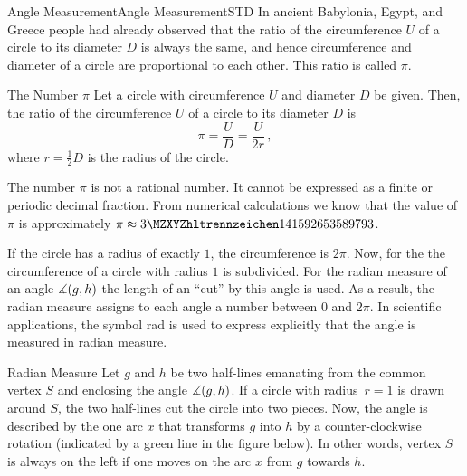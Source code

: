 \begin{MXContent}{Angle Measurement}{Angle Measurement}{STD}
In ancient Babylonia, Egypt, and Greece people had already observed that
the ratio of the circumference $U$ of a circle to its diameter $D$ is always 
the same, and hence circumference and diameter of a circle are proportional to 
each other. This ratio is called $\pi$.


\begin{MXInfo}{The Number $\pi$}%
Let a circle with circumference $U$ and diameter $D$ be given. 
Then, the ratio of the circumference $U$ of a circle to its diameter $D$
is
\[
\pi = \frac{U}{D} = \frac{U}{2r}\, ,%
\]
where $r = \frac{1}{2} D$ is the radius of the circle.

The number $\pi$ is not a rational number. It cannot be expressed as a 
finite or periodic decimal fraction. From numerical calculations we know that
the value of $\pi$ is approximately $\pi \approx \MZahl{3}{141592653589793}$.
\end{MXInfo}

If the circle has a radius of exactly $1$, the circumference is $2\pi$. Now, for the 
 the circumference of a circle with radius $1$ is subdivided. 
For the radian measure of an angle $\measuredangle(g,h)$ the length of an  
``cut'' by this angle is used. As a result, the radian measure assigns to each angle a number 
between $0$ and $2\pi$. In scientific applications, the symbol rad is used to
express explicitly that the angle is measured in radian measure.

\begin{MXInfo}{Radian Measure}%
Let $g$ and $h$ be two half-lines emanating from the common vertex $S$ and enclosing 
the angle $\measuredangle(g,h)$. If a circle with radius~$r = 1$ is drawn around $S$, the
two half-lines cut the circle into two pieces. Now, the angle is described by the one arc $x$ 
that transforms $g$ into $h$ by a counter-clockwise rotation (indicated by a green line in the 
figure below). In other words, vertex $S$ is always on the left if one moves on the 
arc $x$ from $g$ towards $h$.

\begin{center}
\end{center}


\end{MXInfo}
\end{MXContent}
